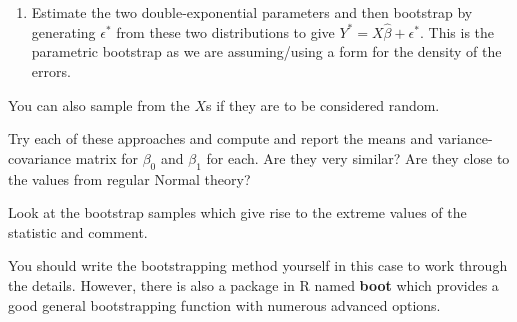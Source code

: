 \documentclass[11pt]{article}
\begin{document}
\begin{enumerate}
\begin{enumerate}
\item Estimate the two double-exponential parameters and then 
    bootstrap by generating $\epsilon^*$ from these two distributions
    to give $Y^* = X\hat{\beta} + \epsilon^*$.
    This is the parametric bootstrap as we are assuming/using a 
    form for the density of the errors.
\end{enumerate}
You can also sample from the $X$s if they are to be considered random.

Try each of these approaches and compute and report the means and
variance-covariance matrix for $\beta_0$ and $\beta_1$ for each.  Are
they very similar? Are they close to the values from regular Normal
theory?

\begin{comment}
For the original problem I was going to give.

Another approach arises from plotting $Y \sim X$.  There is an obvious
linear component.  All the errors are non-negative.  So one could try
to find $\min(Y \vert X)$ and then do the regression on those elements,
essentially ``thinning'' the data and removing the ``errors''.
\end{comment}

 Look at the bootstrap samples which give rise to the extreme values
 of the statistic and comment.

 You should write the bootstrapping method yourself in this case
 to work through the details. However, there is also a package
 in R named \textbf{boot} which provides a good general bootstrapping
 function with numerous advanced options.

\begin{comment}
  k-nearest neighbors of 3 univariate distribution.
\end{comment}

\end{enumerate}
\end{document}
